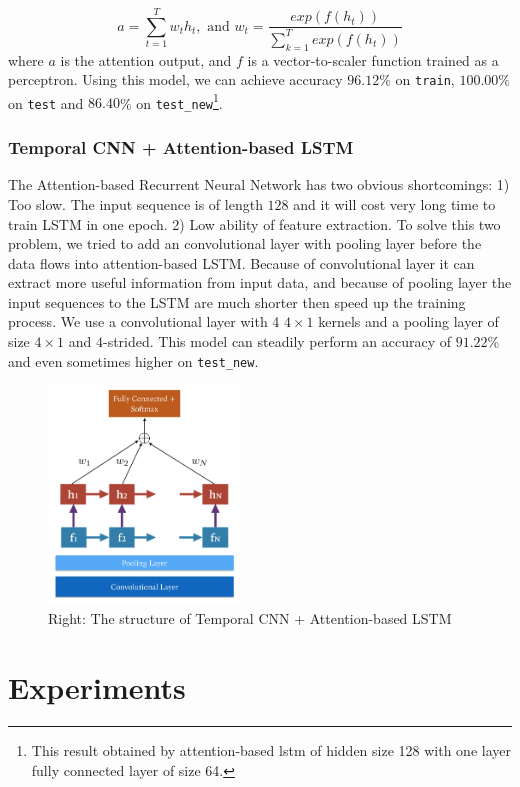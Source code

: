 \documentclass[a4paper]{article}
\begin{document}
\[ a = \sum_{t = 1}^{T} w_{t} h_t, \text{ and } w_{t} = \frac{exp(f(h_t))}{\sum_{k = 1}^{T}exp(f(h_t))}\]
where $a$ is the attention output, and $f$ is a vector-to-scaler function trained as a perceptron. Using this model, we can achieve accuracy $96.12\%$ on \texttt{train}, $100.00\%$ on  \texttt{test} and $86.40$\% on \texttt{test\_new}\footnote{This result obtained by attention-based lstm of hidden size 128 with one layer fully connected layer of size 64.}.

\subsubsection{Temporal CNN + Attention-based LSTM}
The Attention-based Recurrent Neural Network has two obvious shortcomings: 1) Too slow. The input sequence is of length $128$ and it will cost very long time to train LSTM in one epoch. 2) Low ability of feature extraction. To solve this two problem, we tried to add an convolutional layer with pooling layer before the data flows into attention-based LSTM. Because of convolutional layer it can extract more useful information from input data, and because of pooling layer the input sequences to the LSTM are much shorter then speed up the training process.
We use a convolutional layer with 4 $4\times 1$ kernels and a pooling layer of size $4 \times 1$ and $4$-strided. This model can steadily perform an accuracy of $91.22$\% and even sometimes higher on \texttt{test\_new}.

\begin{figure}[H]
	\centering
	\includegraphics[width = 0.45\textwidth]{figs/fig_cnnattenrnn}
	\caption{Right: The structure of Temporal CNN + Attention-based LSTM}
\end{figure}

\section{Experiments}
\end{document}
